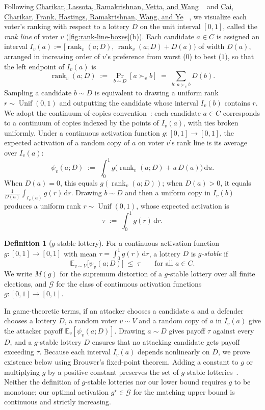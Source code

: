 \documentclass[11pt]{article}
\newcommand{\citelink}[2]{%
  \hyperlink{cite.#2}{\textcolor{CitationBlue}{#1}}%
}
\numberwithin{equation}{section}
\theoremstyle{plain}
\theoremstyle{definition}
\newtheorem{definition}[theorem]{Definition}
\newcommand{\E}{\mathbb{E}}
\newcommand{\1}{\mathbf{1}}
\newcommand{\rank}{\operatorname{rank}}
\newcommand{\calG}{\mathcal{G}}
\begin{document}
Following \citelink{Charikar, Lassota, Ramakrishnan, Vetta, and Wang}{CharikarEtAl25}~\cite{CharikarEtAl25} and \citelink{Cai, Charikar, Frank, Hastings, Ramakrishnan, Wang, and Ye}{CaiEtAl26b}~\cite{CaiEtAl26b}, we visualize each voter's ranking with respect to a lottery $D$ on the unit interval $[0, 1]$, called the \emph{rank line} of voter $v$ (\cref{fig:rank-line-boxes}(b)). Each candidate $a \in C$ is assigned an interval $I_v(a) := [\rank_v(a; D),\, \rank_v(a; D) + D(a))$ of width $D(a)$, arranged in increasing order of $v$'s preference from worst ($0$) to best ($1$), so that the left endpoint of $I_v(a)$ is
\[
  \rank_v(a; D) \;:=\; \Pr_{b \sim D}[a \succ_v b] \;=\; \sum_{b:\, a \succ_v b} D(b).
\]
Sampling a candidate $b \sim D$ is equivalent to drawing a uniform rank $r \sim \operatorname{Unif}(0, 1)$ and outputting the candidate whose interval $I_v(b)$ contains $r$. We adopt the continuum-of-copies convention~\cite{CaiEtAl26b}: each candidate $a \in C$ corresponds to a continuum of copies indexed by the points of $I_v(a)$, with ties broken uniformly. Under a continuous activation function $g \colon [0, 1] \to [0, 1]$, the expected activation of a random copy of $a$ on voter $v$'s rank line is its average over $I_v(a)$:
\[
  \psi_v(a; D) \;:=\; \int_0^1 g\bigl(\rank_v(a; D) + u\,D(a)\bigr)\,\mathrm{d}u.
\]
When $D(a) = 0$, this equals $g(\rank_v(a; D))$; when $D(a) > 0$, it equals $\frac{1}{D(a)}\int_{I_v(a)} g(r)\,\mathrm{d}r$. Drawing $b \sim D$ and then a uniform copy in $I_v(b)$ produces a uniform rank $r \sim \operatorname{Unif}(0, 1)$, whose expected activation is
\[
  \tau \;:=\; \int_0^1 g(r)\,\mathrm{d}r.
\]

\begin{definition}[$g$-stable lottery]
\label{def:g-stable}
For a continuous activation function $g \colon [0, 1] \to [0, 1]$ with mean $\tau = \int_0^1 g(r)\,\mathrm{d}r$, a lottery $D$ is \emph{$g$-stable} if
\[
  \E_{v \sim V}\bigl[\psi_v(a; D)\bigr] \;\le\; \tau
  \qquad \text{for all } a \in C.
\]
We write $M(g)$ for the supremum distortion of a $g$-stable lottery over all finite elections, and $\calG$ for the class of continuous activation functions $g \colon [0, 1] \to [0, 1]$.
\end{definition}

In game-theoretic terms, if an attacker chooses a candidate $a$ and a defender chooses a lottery $D$, a random voter $v \sim V$ and a random copy of $a$ in $I_v(a)$ give the attacker payoff $\E_v[\psi_v(a; D)]$. Drawing $a \sim D$ gives payoff $\tau$ against every $D$, and a $g$-stable lottery $D$ ensures that no attacking candidate gets payoff exceeding $\tau$. Because each interval $I_v(a)$ depends nonlinearly on $D$, we prove existence below using Brouwer's fixed-point theorem. Adding a constant to $g$ or multiplying $g$ by a positive constant preserves the set of $g$-stable lotteries~\cite{CharikarEtAl25,CaiEtAl26b}. Neither the definition of $g$-stable lotteries nor our lower bound requires $g$ to be monotone; our optimal activation $g^\star \in \calG$ for the matching upper bound is continuous and strictly increasing.
\end{document}
